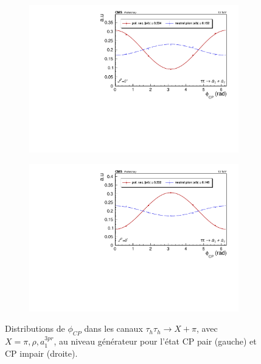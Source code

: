 \begin{figure}[]
    \begin{subfigure}[b]{0.5\linewidth}
    \centering
    \includegraphics[width=\linewidth]{Chapitre6/Images/A1A1/A1A1_even_gen.pdf} 
    \caption*{} 
    \vspace{0.5ex}
  \end{subfigure}%
  \begin{subfigure}[b]{0.5\linewidth}
    \centering
    \includegraphics[width=\linewidth]{Chapitre6/Images/A1A1/A1A1_odd_gen.pdf} 
    \caption*{} 
    \vspace{0.5ex}
  \end{subfigure} 
  \caption{Distributions de $\phi_{CP}$ dans les canaux $\tau_h\tau_h\rightarrow X+\pi$, avec $X=\pi,\rho,a^{3pr}_1$, au niveau générateur pour l'état CP pair (gauche) et CP impair (droite).}
  \label{CPgen}
\end{figure}

